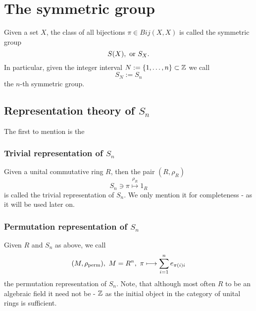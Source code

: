 \section{The symmetric group}
Given a set $X$, the class of all bijections $\pi \in Bij(X,X)$ is called the symmetric group
$$S(X),\ \tmr{or}\ S_X.$$
In particular, given the integer interval $N := \{1,\ldots,n\} \subset \mathbb{Z}$ we call
$$S_N := S_n$$
the $n$-th symmetric group.
\subsection{Representation theory of $S_n$}
The first to mention is the 
\subsubsection{Trivial representation of $S_n$}
Given a unital commutative ring $R$, then the pair $(R,\rho_R)$
$$S_n \ni \pi \stackrel{\rho_R}{\longmapsto} 1_R$$
is called the trivial representation of $S_n$. We only mention it for completeness - as it will be used later on.
\subsubsection{Permutation representation of $S_n$}
Given $R$ and $S_n$ as above, we call
$$(M,\rho_{\mathrm{perm}}),\ M = R^n,\ \pi \longmapsto \sum_{i=1}^n e_{\pi(i)i}$$
the permutation representation of $S_n$. Note, that although most often $R$ to be an algebraic field it need not be - $\mathbb{Z}$ as the initial object in the category of unital rings is sufficient.

